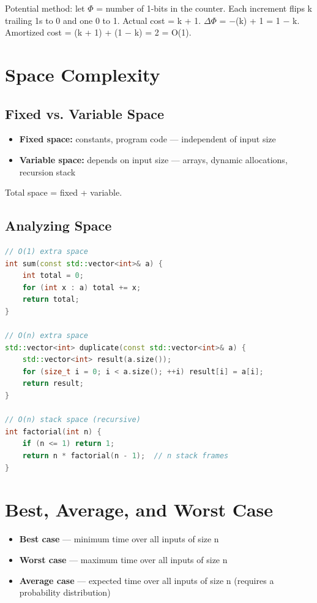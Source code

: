 Potential method: let $\Phi$ = number of 1-bits in the counter. Each increment flips k trailing 1s to 0 and one 0 to 1. Actual cost = k + 1. $\Delta\Phi$ = $-$(k) + 1 = 1 $-$ k. Amortized cost = (k + 1) + (1 $-$ k) = 2 = O(1).

\section{Space Complexity}

\subsection{Fixed vs. Variable Space}

\begin{itemize}
\item \textbf{Fixed space:} constants, program code — independent of input size
\item \textbf{Variable space:} depends on input size — arrays, dynamic allocations, recursion stack
\end{itemize}

Total space = fixed + variable.

\subsection{Analyzing Space}

\begin{lstlisting}[language=C++]
// O(1) extra space
int sum(const std::vector<int>& a) {
    int total = 0;
    for (int x : a) total += x;
    return total;
}

// O(n) extra space
std::vector<int> duplicate(const std::vector<int>& a) {
    std::vector<int> result(a.size());
    for (size_t i = 0; i < a.size(); ++i) result[i] = a[i];
    return result;
}

// O(n) stack space (recursive)
int factorial(int n) {
    if (n <= 1) return 1;
    return n * factorial(n - 1);  // n stack frames
}
\end{lstlisting}

\section{Best, Average, and Worst Case}

\begin{itemize}
\item \textbf{Best case} — minimum time over all inputs of size n
\item \textbf{Worst case} — maximum time over all inputs of size n
\item \textbf{Average case} — expected time over all inputs of size n (requires a probability distribution)
\end{itemize}

